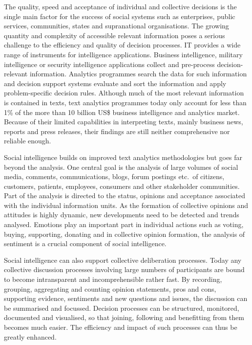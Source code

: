 \documentclass[10pt, plain]{../../metanetpaper}
\begin{document}
\begin{multicols}{2}
The quality, speed and acceptance of individual and collective decisions is the single main factor for the success of social systems such as enterprises, public services, communities, states and supranational organisations. The growing quantity and complexity of accessible relevant information poses a serious challenge to the efficiency and quality of decision processes. IT provides a wide range of instruments for intelligence applications. Business intelligence, military intelligence or security intelligence applications collect and pre-process decision-relevant information. Analytics programmes search the data for such information and decision support systems evaluate and sort the information and apply problem-specific decision rules. Although much of the most relevant information is contained in texts, text analytics programmes today only account for less than 1\% of the more than 10 billion US\$ business intelligence and analytics market. Because of their limited capabilities in interpreting texts, mainly business news, reports and press releases, their findings are still neither comprehensive nor reliable enough.
 
Social intelligence builds on improved text analytics methodologies but goes far beyond the analysis. One central goal is the analysis of large volumes of social media, comments, communications, blogs, forum postings etc.~of citizens, customers, patients, employees, consumers and other stakeholder communities. Part of the analysis is directed to the status, opinions and acceptance associated with the individual information units. As the formation of collective opinions and attitudes is highly dynamic, new developments need to be detected and trends analysed. Emotions play an important part in individual actions such as voting, buying, supporting, donating and in collective opinion formation, the analysis of sentiment is a crucial component of social intelligence.  
 
Social intelligence can also support collective deliberation processes. Today any collective discussion processes involving large numbers of participants are bound to become intransparent and incomprehensible rather fast. By recording, grouping, aggregating and counting opinion statements, pros and cons, supporting evidence, sentiments and new questions and issues, the discussion can be summarised and focussed. Decision processes can be structured, monitored, documented and visualised, so that joining, following and benefitting from them becomes much easier. The efficiency and impact of such processes can thus be greatly enhanced.
 

\end{multicols}
\end{document}
